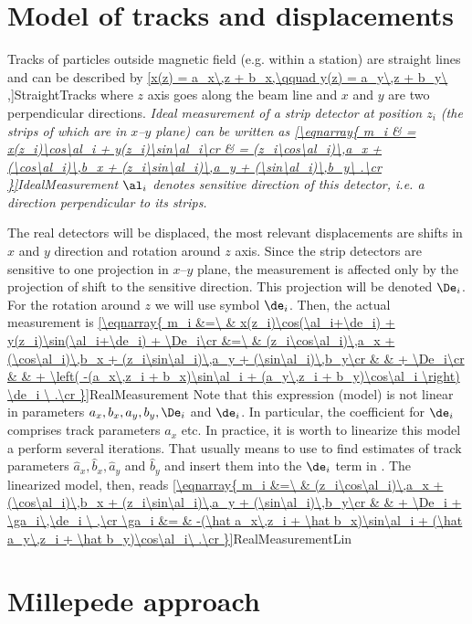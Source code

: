 \section{Model of tracks and displacements}

Tracks of particles outside magnetic field (e.g. within a station) are straight lines and can be described by
\eqref{x(z) = a_x\,z + b_x,\qquad y(z) = a_y\,z + b_y\ ,}{StraightTracks}
where $z$ axis goes along the beam line and $x$ and $y$ are two perpendicular directions. \em{Ideal} measurement of a strip detector at position $z_i$ (the strips of which are in $x$--$y$ plane) can be written as
\eqref{\eqnarray{
m_i & = x(z_i)\cos\al_i + y(z_i)\sin\al_i\cr
	& = (z_i\cos\al_i)\,a_x + (\cos\al_i)\,b_x + (z_i\sin\al_i)\,a_y + (\sin\al_i)\,b_y\ .\cr
}}{IdealMeasurement}
$\al_i$ denotes sensitive direction of this detector, i.e. a direction perpendicular to its strips.

The real detectors will be displaced, the most relevant displacements are shifts in $x$ and $y$ direction and rotation around $z$ axis. Since the strip detectors are sensitive to one projection in $x$--$y$ plane, the measurement is affected only by the projection of shift to the sensitive direction. This projection will be denoted $\De_i$. For the rotation around $z$ we will use symbol $\de_i$. Then, the actual measurement is
\eqref{\eqnarray{
m_i &=\ & x(z_i)\cos(\al_i+\de_i) + y(z_i)\sin(\al_i+\de_i) + \De_i\cr
	&=\ & (z_i\cos\al_i)\,a_x + (\cos\al_i)\,b_x + (z_i\sin\al_i)\,a_y + (\sin\al_i)\,b_y\cr
	&	& + \De_i\cr
	&	& + \left( -(a_x\,z_i + b_x)\sin\al_i + (a_y\,z_i + b_y)\cos\al_i \right) \de_i \ .\cr
}}{RealMeasurement}
Note that this expression (model) is not linear in parameters $a_x, b_x, a_y, b_y, \De_i$ and $\de_i$. In particular, the coefficient for $\de_i$ comprises track parameters $a_x$ etc. In practice, it is worth to linearize this model a perform several iterations. That usually means to use  to find estimates of track parameters $\hat a_x, \hat b_x, \hat a_y$ and $\hat b_y$ and insert them into the $\de_i$ term in . The linearized model, then, reads
\eqref{\eqnarray{
m_i		&=\ & (z_i\cos\al_i)\,a_x + (\cos\al_i)\,b_x + (z_i\sin\al_i)\,a_y + (\sin\al_i)\,b_y\cr
		&	& + \De_i + \ga_i\,\de_i \ ,\cr
\ga_i	&=	& -(\hat a_x\,z_i + \hat b_x)\sin\al_i + (\hat a_y\,z_i + \hat b_y)\cos\al_i\ .\cr
}}{RealMeasurementLin}

\section{Millepede approach}

